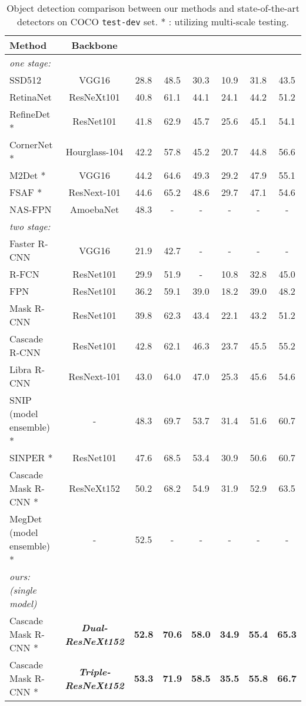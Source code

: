 \documentclass[letterpaper]{article} \usepackage{aaai20}  \usepackage{multirow}
\begin{document}
\begin{table*}[t]
	\centering
	\small
\begin{tabular}{l|c|ccc|ccc}
\toprule
		Method & Backbone & &  &  &  &  &   \\ \hline
\textit{one stage:} & & & & & & \\
		SSD512 \cite{liu2015ssd}&VGG16 &28.8 & 48.5 & 30.3 & 10.9 & 31.8 & 43.5 \\
		RetinaNet \cite{lin2017focal}&ResNeXt101&40.8 &61.1 & 44.1&24.1 &44.2 & 51.2\\
		RefineDet \cite{zhang2018single}*& ResNet101&41.8 & 62.9 & 45.7 & 25.6 & 45.1 & 54.1 \\
		CornerNet \cite{zhang2018single}*& Hourglass-104 &42.2&57.8&45.2&20.7&44.8&56.6 \\
		M2Det \cite{zhao2018m2det}*&VGG16&44.2&64.6&49.3&29.2&47.9&55.1\\
		FSAF \cite{zhu2019feature}*&ResNext-101&44.6&65.2&48.6&29.7&47.1&54.6\\
		NAS-FPN \cite{ghiasi2019fpn}&AmoebaNet&48.3&- &- & -&- &-\\
		\hline
		\textit{two stage:} & & & & & & \\
		Faster R-CNN \cite{ren2015faster}&VGG16 & 21.9 & 42.7&- &- &- &- \\
		R-FCN \cite{dai2016r}&ResNet101&29.9&51.9 &- &10.8 &32.8 & 45.0\\
		FPN \cite{lin2017feature}&ResNet101&36.2&59.1 &39.0 &18.2 &39.0 & 48.2\\
		Mask R-CNN \cite{he2017mask}&ResNet101&39.8 & 62.3 & 43.4 & 22.1 & 43.2& 51.2 \\
		Cascade R-CNN \cite{cai18cascadercnn}&ResNet101&42.8 &62.1&46.3&23.7&45.5&55.2  \\
		Libra R-CNN \cite{pang2019libra}&ResNext-101&43.0&64.0&47.0&25.3&45.6&54.6\\
		SNIP (model ensemble) \cite{singh2018analysis}*&- &48.3 & 69.7 & 53.7 & 31.4 & 51.6 & 60.7 \\
		SINPER \cite{singh2018sniper}*&ResNet101&47.6 &68.5 &53.4 &30.9 &50.6&60.7 \\
		Cascade Mask R-CNN \cite{Detectron2018}*&ResNeXt152 & 50.2 & 68.2 & 54.9 & 31.9 & 52.9 & 63.5\\
		MegDet (model ensemble) \cite{peng2018megdet}* & - & 52.5 & - & - & - & - & - \\
		\hline
		\textit{ours:(single model)} & & & & & & \\
		Cascade Mask R-CNN * &\textbf{\textit{Dual-ResNeXt152}}&\textbf{52.8} & \textbf{70.6} & \textbf{58.0} & \textbf{34.9} & \textbf{55.4} & \textbf{65.3}\\
		Cascade Mask R-CNN * &\textbf{\textit{Triple-ResNeXt152}}& \textbf{53.3} & \textbf{71.9} & \textbf{58.5} & \textbf{35.5} & \textbf{55.8} & \textbf{66.7}\\
\bottomrule
	\end{tabular}
	\caption{Object detection comparison between our methods and state-of-the-art detectors on COCO \texttt{test-dev} set. * : utilizing multi-scale testing.} \label{table:detection compare} \end{table*}
\end{document}
